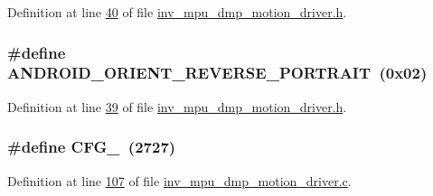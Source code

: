 Definition at line \hyperlink{inv__mpu__dmp__motion__driver_8h_source_l00040}{40} of file \hyperlink{inv__mpu__dmp__motion__driver_8h_source}{inv\+\_\+mpu\+\_\+dmp\+\_\+motion\+\_\+driver.\+h}.

\subsubsection[{\texorpdfstring{A\+N\+D\+R\+O\+I\+D\+\_\+\+O\+R\+I\+E\+N\+T\+\_\+\+R\+E\+V\+E\+R\+S\+E\+\_\+\+P\+O\+R\+T\+R\+A\+IT}{ANDROID_ORIENT_REVERSE_PORTRAIT}}]{\setlength{\rightskip}{0pt plus 5cm}\#define A\+N\+D\+R\+O\+I\+D\+\_\+\+O\+R\+I\+E\+N\+T\+\_\+\+R\+E\+V\+E\+R\+S\+E\+\_\+\+P\+O\+R\+T\+R\+A\+IT~(0x02)}\hypertarget{group___d_r_i_v_e_r_s_ga63b8f82e9d60a84b6fca8c680d78c866}{}\label{group___d_r_i_v_e_r_s_ga63b8f82e9d60a84b6fca8c680d78c866}


Definition at line \hyperlink{inv__mpu__dmp__motion__driver_8h_source_l00039}{39} of file \hyperlink{inv__mpu__dmp__motion__driver_8h_source}{inv\+\_\+mpu\+\_\+dmp\+\_\+motion\+\_\+driver.\+h}.

\subsubsection[{\texorpdfstring{C\+F\+G\+\_\+15}{CFG_15}}]{\setlength{\rightskip}{0pt plus 5cm}\#define C\+F\+G\+\_~(2727)}\hypertarget{group___d_r_i_v_e_r_s_ga1fe6e4489855269e7197beb38b07c723}{}\label{group___d_r_i_v_e_r_s_ga1fe6e4489855269e7197beb38b07c723}


Definition at line \hyperlink{inv__mpu__dmp__motion__driver_8c_source_l00107}{107} of file \hyperlink{inv__mpu__dmp__motion__driver_8c_source}{inv\+\_\+mpu\+\_\+dmp\+\_\+motion\+\_\+driver.\+c}.

